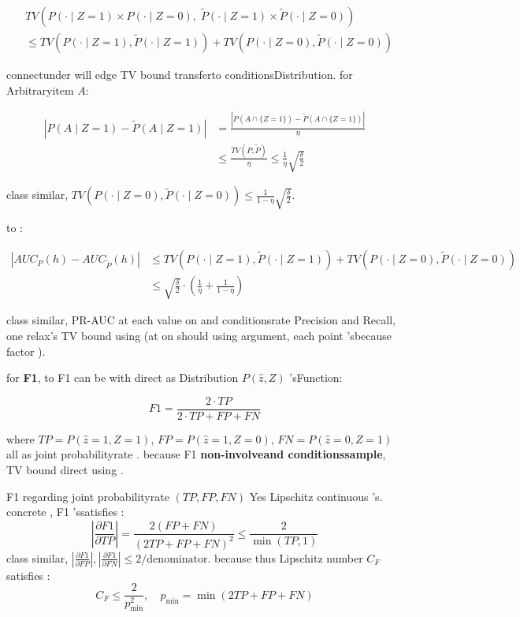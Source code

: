 \documentclass[
  12pt,
]{article}
\begin{document}
\[\begin{aligned}
&TV\left(P(\cdot \mid Z=1) \times P(\cdot \mid Z=0),\; \tilde{P}(\cdot \mid Z=1) \times \tilde{P}(\cdot \mid Z=0)\right) \\
&\leq TV(P(\cdot \mid Z=1), \tilde{P}(\cdot \mid Z=1)) + TV(P(\cdot \mid Z=0), \tilde{P}(\cdot \mid Z=0))
\end{aligned}\]

connectunder will edge TV bound transferto conditionsDistribution. for Arbitraryitem  \(A\): 

\[\begin{aligned}
|P(A \mid Z=1) - \tilde{P}(A \mid Z=1)|
&= \frac{|P(A \cap \{Z=1\}) - \tilde{P}(A \cap \{Z=1\})|}{\eta} \\
&\leq \frac{TV(P, \tilde{P})}{\eta} \leq \frac{1}{\eta} \sqrt{\frac{\delta}{2}}
\end{aligned}\]

class similar, \(TV(P(\cdot \mid Z=0), \tilde{P}(\cdot \mid Z=0)) \leq \frac{1}{1-\eta} \sqrt{\frac{\delta}{2}}\). 

to : 

\[\begin{aligned}
|AUC_P(h) - AUC_{\tilde{P}}(h)|
&\leq TV(P(\cdot \mid Z=1), \tilde{P}(\cdot \mid Z=1)) + TV(P(\cdot \mid Z=0), \tilde{P}(\cdot \mid Z=0)) \\
&\leq \sqrt{\frac{\delta}{2}} \cdot \left(\frac{1}{\eta} + \frac{1}{1-\eta}\right)
\end{aligned}\]

class similar, PR-AUC at each value on and conditionsrate  Precision and  Recall, one relax's
TV bound using (at on should using argument, each point 'sbecause factor ). 

for  \textbf{F1}, to  F1 can be with direct as Distribution \(P(\hat{z}, Z)\)
'sFunction: 

\[F1 = \frac{2 \cdot TP}{2 \cdot TP + FP + FN}\]

where
\(TP = P(\hat{z}=1, Z=1)\), \(FP = P(\hat{z}=1, Z=0)\), \(FN = P(\hat{z}=0, Z=1)\)
all as joint probabilityrate . because  F1 \textbf{non-involveand conditionssample}, TV bound direct using . 

F1 regarding joint probabilityrate  \((TP, FP, FN)\) Yes Lipschitz continuous 's. concrete , F1
'ssatisfies : 
\[\left|\frac{\partial F1}{\partial TP}\right| = \frac{2(FP+FN)}{(2TP+FP+FN)^2} \leq \frac{2}{\min(TP, 1)}\]
class similar, \(\left|\frac{\partial F1}{\partial FP}\right|, \left|\frac{\partial F1}{\partial FN}\right| \leq 2 / \text{denominator}\). because thus
Lipschitz number  \(C_F\) satisfies : 
\[C_F \leq \frac{2}{p_{\min}^2}, \quad p_{\min} = \min(2TP+FP+FN)\]
\end{document}
